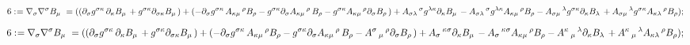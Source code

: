 \documentclass[11pt]{article}
\def\specialcolon{\mathrel{\mathop{:}}\hspace{-.5em}}
\begin{document}
\begin{dmath*}[compact, spread=2pt]
6\specialcolon{}= {\nabla}_{\sigma}{{\nabla}^{\sigma}{{B}_{\mu}}\, }\,  = (({\partial}_{\sigma}{{g}^{\sigma \kappa}}\,  {\partial}_{\kappa}{{B}_{\mu}}\,  + {g}^{\sigma \kappa} {\partial}_{\sigma \kappa}{{B}_{\mu}}\, ) + ( - {\partial}_{\sigma}{{g}^{\sigma \kappa}}\,  {A}_{\kappa \mu}\,^{\rho} {B}_{\rho} - {g}^{\sigma \kappa} {\partial}_{\sigma}{{A}_{\kappa \mu}\,^{\rho}}\,  {B}_{\rho} - {g}^{\sigma \kappa} {A}_{\kappa \mu}\,^{\rho} {\partial}_{\sigma}{{B}_{\rho}}\, ) + {A}_{\sigma \lambda}\,^{\sigma} {g}^{\lambda \kappa} {\partial}_{\kappa}{{B}_{\mu}}\,  - {A}_{\sigma \lambda}\,^{\sigma} {g}^{\lambda \kappa} {A}_{\kappa \mu}\,^{\rho} {B}_{\rho} - {A}_{\sigma \mu}\,^{\lambda} {g}^{\sigma \kappa} {\partial}_{\kappa}{{B}_{\lambda}}\,  + {A}_{\sigma \mu}\,^{\lambda} {g}^{\sigma \kappa} {A}_{\kappa \lambda}\,^{\rho} {B}_{\rho});
\end{dmath*}
\begin{dmath*}[compact, spread=2pt]
6\specialcolon{}= {\nabla}_{\sigma}{{\nabla}^{\sigma}{{B}_{\mu}}\, }\,  = (({\partial}_{\sigma}{{g}^{\sigma \kappa}}\,  {\partial}_{\kappa}{{B}_{\mu}}\,  + {g}^{\sigma \kappa} {\partial}_{\sigma \kappa}{{B}_{\mu}}\, ) + ( - {\partial}_{\sigma}{{g}^{\sigma \kappa}}\,  {A}_{\kappa \mu}\,^{\rho} {B}_{\rho} - {g}^{\sigma \kappa} {\partial}_{\sigma}{{A}_{\kappa \mu}\,^{\rho}}\,  {B}_{\rho} - {A}^{\sigma}\,_{\mu}\,^{\rho} {\partial}_{\sigma}{{B}_{\rho}}\, ) + {A}_{\sigma}\,^{\kappa \sigma} {\partial}_{\kappa}{{B}_{\mu}}\,  - {A}_{\sigma}\,^{\kappa \sigma} {A}_{\kappa \mu}\,^{\rho} {B}_{\rho} - {A}^{\kappa}\,_{\mu}\,^{\lambda} {\partial}_{\kappa}{{B}_{\lambda}}\,  + {A}^{\kappa}\,_{\mu}\,^{\lambda} {A}_{\kappa \lambda}\,^{\rho} {B}_{\rho});
\end{dmath*}
\end{document}
